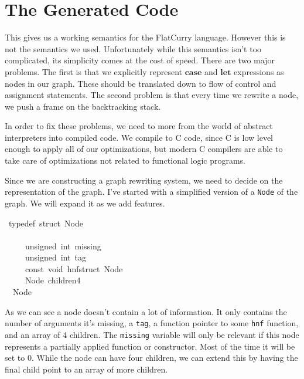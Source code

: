 \documentclass{book}
\theoremstyle{definition}
\begin{document}
\section{The Generated Code}

This gives us a working semantics for the FlatCurry language.
However this is not the semantics we used.
Unfortunately while this semantics isn't too complicated,
its simplicity comes at the cost of speed.
There are two major problems.
The first is that we explicitly represent \ensuremath{\mathbf{case}} and \ensuremath{\mathbf{let}} expressions as nodes in our graph.
These should be translated down to flow of control and assignment statements.
The second problem is that every time we rewrite a node, we push a frame on the backtracking stack.

In order to fix these problems, we need to more from the world of abstract interpreters into compiled code.
We compile to C code, since C is low level enough to apply all of our optimizations,
but modern C compilers are able to take care of optimizations not related to functional logic programs.

Since we are constructing a graph rewriting system, we need to decide on the representation of the graph.
I've started with a simplified version of a \texttt{Node} of the graph.
We will expand it as we add features.

\begin{tabbing}\ttfamily
~typedef~struct~Node\\
\ttfamily ~\\
\ttfamily ~~~~~unsigned~int~missing\\
\ttfamily ~~~~~unsigned~int~tag\\
\ttfamily ~~~~~const~void~hnfstruct~Node\\
\ttfamily ~~~~~Node~children4\\
\ttfamily ~~Node
\end{tabbing}

As we can see a node doesn't contain a lot of information.
It only contains the number of arguments it's missing, a \texttt{tag},
a function pointer to some \texttt{hnf} function, and an array of 4 children.
The \texttt{missing} variable will only be relevant if this node represents a partially applied function
or constructor.  Most of the time it will be set to 0.
While the node can have four children, we can extend this by having the final child point to an
array of more children.
\end{document}
